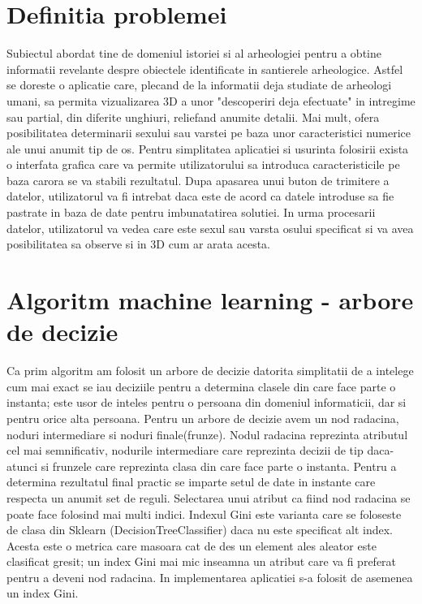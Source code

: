 \documentclass[runningheads,a4paper,11pt]{report}
\begin{document}
\section{Definitia problemei}
\label{section:definitiaProblemei}
Subiectul abordat tine de domeniul istoriei si al arheologiei pentru a obtine informatii revelante despre obiectele identificate in santierele arheologice. Astfel se doreste o aplicatie care, plecand de la informatii deja studiate de arheologi umani, sa permita vizualizarea 3D a unor "descoperiri deja efectuate" in intregime sau partial, din diferite unghiuri, reliefand anumite detalii. Mai mult, ofera posibilitatea determinarii sexului sau varstei pe baza unor caracteristici numerice ale unui anumit tip de os. \newline \newline
Pentru simplitatea aplicatiei si usurinta folosirii exista o interfata grafica care va permite utilizatorului sa introduca caracteristicile pe baza carora se va stabili rezultatul. Dupa apasarea unui buton de trimitere a datelor, utilizatorul va fi intrebat daca este de acord ca datele introduse sa fie pastrate in baza de date pentru imbunatatirea solutiei. In urma procesarii datelor, utilizatorul va vedea care este sexul sau varsta osului specificat si va avea posibilitatea sa observe si in 3D cum ar arata acesta. \newline

\section{Algoritm machine learning - arbore de decizie}
\label{algoritmi}
Ca prim algoritm am folosit un arbore de decizie datorita simplitatii de a intelege cum mai exact se iau deciziile pentru a determina clasele din care face parte o instanta; este usor de inteles pentru o persoana din domeniul informaticii, dar si pentru orice alta persoana. \newline \newline
Pentru un arbore de decizie avem un nod radacina, noduri intermediare si noduri finale(frunze). Nodul radacina reprezinta atributul cel mai semnificativ, nodurile intermediare care reprezinta decizii de tip daca-atunci si frunzele care reprezinta clasa din care face parte o instanta. Pentru a determina rezultatul final practic se imparte setul de date in instante care respecta un anumit set de reguli. \newline \newline
Selectarea unui atribut ca fiind nod radacina se poate face folosind mai multi indici. Indexul Gini este varianta care se foloseste de clasa din Sklearn (DecisionTreeClassifier) daca nu este specificat alt index. Acesta este o metrica care masoara cat de des un element ales aleator este clasificat gresit; un index Gini mai mic inseamna un atribut care va fi preferat pentru a deveni nod radacina. In implementarea aplicatiei s-a folosit de asemenea un index Gini.
\end{document}
